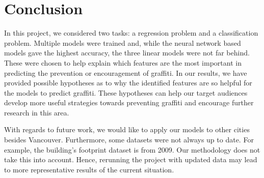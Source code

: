 \chapter{Conclusion}

In this project, we considered two tasks: a regression problem and a classification problem. Multiple models were trained and, while the neural network based models gave the highest accuracy, the three linear models were not far behind. These were chosen to help explain which features are the most important in predicting the prevention or encouragement of graffiti. In our results, we have provided possible hypotheses as to why the identified features are so helpful for the models to predict graffiti. These hypotheses can help our target audiences develop more useful strategies towards preventing graffiti and encourage further research in this area.

With regards to future work, we would like to apply our models to other cities besides Vancouver. Furthermore, some datasets were not always up to date. For example, the building's footprint dataset is from 2009. Our methodology does not take this into account. Hence, rerunning the project with updated data may lead to more representative results of the current situation.
